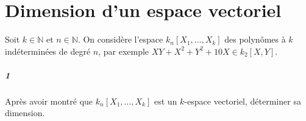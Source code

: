 \documentclass[10pt,a4paper]{article}
\begin{document}
\section{Dimension d'un espace vectoriel}
Soit $k \in \mathbb{N}$ et $n \in \mathbb{N}$. On considère l'espace $k_n[X_1, \dots, X_k]$ des polynômes à $k$ indéterminées de degré $n$, par exemple $XY +X^2+Y^2+10X \in k_2[X,Y]$.
\subparagraph{1}Après avoir montré que $k_n[X_1, \dots, X_k]$ est un $k$-espace vectoriel, déterminer sa dimension.
\end{document}

